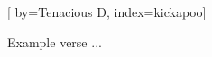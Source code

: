 
[%
    by={Tenacious D},
    index={kickapoo}]


    \label{kickapoo}

    \beginverse
        Example verse ...
    \endverse
\endsong
